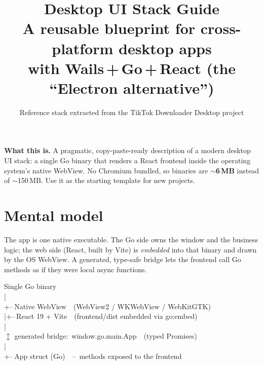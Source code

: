 \documentclass[11pt,a4paper]{article}
\title{\vspace{-1.2cm}\bfseries\color{ink}\Huge Desktop UI Stack Guide\\[4pt]
  \large\color{muted}\normalfont A reusable blueprint for cross-platform desktop apps\\
  \normalsize with \textbf{Wails\,+\,Go\,+\,React} (the ``Electron alternative'')}
\author{}
\date{\small\color{muted}Reference stack extracted from the TikTok Downloader Desktop project}
\begin{document}
\maketitle
\thispagestyle{fancy}
\vspace{-0.8cm}

\begin{callout}
\textbf{What this is.} A pragmatic, copy-paste-ready description of a modern
desktop UI stack: a single Go binary that renders a React frontend inside the
operating system's native WebView. No Chromium bundled, so binaries are
\textbf{$\sim$6\,MB} instead of $\sim$150\,MB. Use it as the starting template
for new projects.
\end{callout}

\section{Mental model}

The app is one native executable. The Go side owns the window and the business
logic; the web side (React, built by Vite) is \emph{embedded} into that binary
and drawn by the OS WebView. A generated, type-safe bridge lets the frontend
call Go methods as if they were local async functions.

\begin{center}
\begin{tcolorbox}[colback=white,colframe=codeframe,boxrule=0.6pt,arc=3pt,width=\linewidth]
\ttfamily\small
Single Go binary\\
\hspace*{1em}|\\
\hspace*{1em}+--\,Native WebView\ \ (WebView2 / WKWebView / WebKitGTK)\\
\hspace*{1em}|\hspace*{4em}+--\,React 19 + Vite\ \ (frontend/dist embedded via go:embed)\\
\hspace*{1em}|\\
\hspace*{1em}\textcolor{accent}{$\updownarrow$ generated bridge:}\ window.go.main.App\ \ (typed Promises)\\
\hspace*{1em}|\\
\hspace*{1em}+--\,App struct (Go)\ \ --\ methods exposed to the frontend
\end{tcolorbox}
\end{center}
\end{document}
